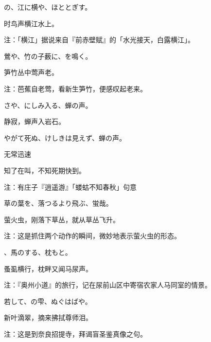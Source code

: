 \begin{haiku}
    {\FH {}の、江に横や、ほととぎす。}

    {\FK 时鸟声横江水上。}

    {\FT 注：「横江」据说来自『前赤壁赋』的「水光接天，白露横江」。}
\end{haiku}

\begin{haiku}
    {\FH 鶯や、竹の子薮に、を鳴く。}

    {\FK 笋竹丛中莺声老。}

    {\FT 注：芭蕉自老莺，看新生笋竹，便感叹起老来。}
\end{haiku}

\begin{haiku}
    {\FH {}さや、にしみ入る、蝉の声。}

    {\FK 静寂，蝉声入岩石。}
\end{haiku}

\begin{haiku}
    {\FH やがて死ぬ、けしきは見えず、蝉の声。}

    {\FK 无常迅速}

    {\FK 知了在叫，不知死期快到。}

    {\FT 注：有庄子『逍遥游』「蝼蛄不知春秋」句意}
\end{haiku}

\begin{haiku}
    {\FH 草の葉を、落つるより飛ぶ、蛍哉。}

    {\FK 萤火虫，刚落下草丛，就从草丛飞升。}

    {\FT 注：这是抓住两个动作的瞬间，微妙地表示萤火虫的形态。}
\end{haiku}

\begin{haiku}
    {\FH {}、馬のする、枕もと。}

    {\FK 蚤虱横行，枕畔又闻马尿声。}

    {\FT 注：『奥州小道』的旅行，记在尿前山区中寄宿农家人马同室的情景。}
\end{haiku}

\begin{haiku}
    {\FH 若して、の雫、ぬぐはばや。}

    {\FK 新叶滴翠，摘来拂拭尊师泪。}

    {\FT 注：这是到奈良招提寺，拜谒盲圣鉴真像之句。}
\end{haiku}

